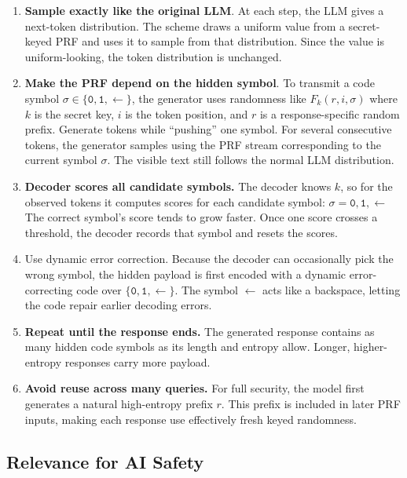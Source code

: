 \documentclass[11pt]{article}
\begin{document}
\begin{enumerate}
  \item \textbf{Sample exactly like the original LLM}. At each step, the LLM
        gives a next-token distribution. The scheme draws a uniform value from
        a secret-keyed PRF and uses it to sample from that distribution. Since
        the value is uniform-looking, the token distribution is unchanged.
  \item \textbf{Make the PRF depend on the hidden symbol}. To transmit a code
        symbol $\sigma \in \{\texttt{0},\texttt{1},\leftarrow\}$, the generator uses randomness
        like $F_k(r,i,\sigma)$ where $k$ is the secret key, $i$ is the token
        position, and $r$ is a response-specific random prefix.
        Generate tokens while ``pushing'' one symbol.
        For several consecutive tokens, the generator samples using the PRF
        stream corresponding to the current symbol $\sigma$. The visible text
        still follows the normal LLM distribution.
  \item \textbf{Decoder scores all candidate symbols.} The decoder knows $k$,
        so for the observed tokens it computes scores for each candidate
        symbol: $\sigma = \texttt{0},\texttt{1},\leftarrow$ The correct symbol's score tends to
        grow faster. Once one score crosses a threshold, the decoder records
        that symbol and resets the scores.
  \item Use dynamic error correction. Because the decoder can occasionally pick
        the wrong symbol, the hidden payload is first encoded with a dynamic
        error-correcting code over $\{\texttt{0},\texttt{1},\leftarrow\}$. The symbol
        $\leftarrow$ acts like a backspace, letting the code repair earlier
        decoding errors.
  \item \textbf{Repeat until the response ends.} The generated response
        contains as many hidden code symbols as its length and entropy allow.
        Longer, higher-entropy responses carry more payload.
  \item \textbf{Avoid reuse across many queries.} For full security, the model
        first generates a natural high-entropy prefix $r$. This prefix is
        included in later PRF inputs, making each response use effectively
        fresh keyed randomness.
\end{enumerate}

\subsection{Relevance for AI Safety}
\label{sec:relevance}
\end{document}
